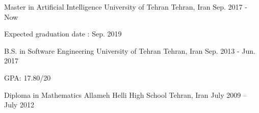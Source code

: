

\begin{cventries}
  
  \cventry
    {Master in Artificial Intelligence} %
    {University of Tehran} %
    {Tehran, Iran} %
    {Sep. 2017 - Now} %
    {
      \begin{cvitems} %
        \item {Expected graduation date : Sep. 2019}
      \end{cvitems}
    }
  \cventry
    {B.S. in Software Engineering} %
    {University of Tehran} %
    {Tehran, Iran} %
    {Sep. 2013 - Jun. 2017} %
    {
      \begin{cvitems} %
        \item {GPA: 17.80/20}
      \end{cvitems}
    }
    
  \cventry
  	{Diploma in Mathematics}
  	{Allameh Helli High School}
  	{Tehran, Iran}
  	{July 2009 – July 2012}
  	{}

\end{cventries}

